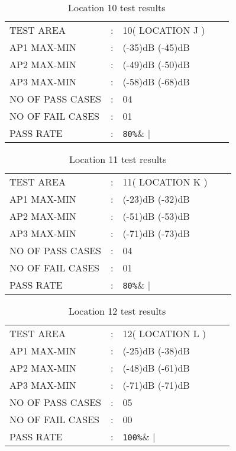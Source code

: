 \documentclass{report}
\begin{document}
	\begin{table}[H]
		\centering
		\label{LOCATION TEN TEST}
		\begin{tabular}{lllll}
			TEST AREA& :&  10( LOCATION J )&    \\
			AP1 MAX-MIN& :& (-35)dB (-45)dB&  \\
			AP2 MAX-MIN& :& (-49)dB (-50)dB&   \\
			AP3 MAX-MIN& :& (-58)dB (-68)dB&   \\
			NO OF PASS CASES& :& 04&  \\
			NO OF FAIL CASES& :& 01&   \\
			PASS RATE& :& \verb|80%|&   
		\end{tabular}
		\caption{Location 10 test results}
	\end{table}
	
	\begin{table}[H]
		\centering
		\label{LOCATION ELEVEN TEST}
		\begin{tabular}{lllll}
			TEST AREA& :&  11( LOCATION K )&    \\
			AP1 MAX-MIN& :& (-23)dB (-32)dB&  \\
			AP2 MAX-MIN& :& (-51)dB (-53)dB&   \\
			AP3 MAX-MIN& :& (-71)dB (-73)dB&   \\
			NO OF PASS CASES& :& 04&  \\
			NO OF FAIL CASES& :& 01&   \\
			PASS RATE& :& \verb|80%|&   
		\end{tabular}
		\caption{Location 11 test results}
	\end{table}
	
	\begin{table}[H]
		\centering
		\label{LOCATION TWELEVE TEST}
		\begin{tabular}{lllll}
			TEST AREA& :&  12( LOCATION L )&    \\
			AP1 MAX-MIN& :& (-25)dB (-38)dB&  \\
			AP2 MAX-MIN& :& (-48)dB (-61)dB&   \\
			AP3 MAX-MIN& :& (-71)dB (-71)dB&   \\
			NO OF PASS CASES& :& 05&  \\
			NO OF FAIL CASES& :& 00&   \\
			PASS RATE& :& \verb|100%|&   
		\end{tabular}
		\caption{Location 12 test results}
	\end{table}
	
\end{document}
